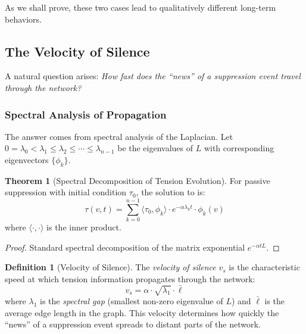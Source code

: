 \documentclass[12pt,a4paper]{article}
\theoremstyle{definition}
\newtheorem{definition}{Definition}[section]
\newtheorem{theorem}{Theorem}[section]
\theoremstyle{remark}
\begin{document}
As we shall prove, these two cases lead to qualitatively different long-term behaviors.

\subsection{The Velocity of Silence}

A natural question arises: \emph{How fast does the ``news'' of a suppression event travel through the network?}

\subsubsection{Spectral Analysis of Propagation}

The answer comes from spectral analysis of the Laplacian. Let $0 = \lambda_0 < \lambda_1 \leq \lambda_2 \leq \cdots \leq \lambda_{n-1}$ be the eigenvalues of $L$ with corresponding eigenvectors $\{\phi_k\}$.

\begin{theorem}[Spectral Decomposition of Tension Evolution]
\label{thm:spectral}
For passive suppression with initial condition $\tau_0$, the solution to  is:
\begin{equation}
    \tau(v, t) = \sum_{k=0}^{n-1} \langle \tau_0, \phi_k \rangle \cdot e^{-\alpha \lambda_k t} \cdot \phi_k(v)
\end{equation}
where $\langle \cdot, \cdot \rangle$ is the inner product.
\end{theorem}

\begin{proof}
Standard spectral decomposition of the matrix exponential $e^{-\alpha t L}$.
\end{proof}

\begin{definition}[Velocity of Silence]
\label{def:velocity-silence}
The \emph{velocity of silence} $v_s$ is the characteristic speed at which tension information propagates through the network:
\begin{equation}
    \boxed{
    v_s = \alpha \cdot \sqrt{\lambda_1} \cdot \bar{\ell}
    }
\end{equation}
where $\lambda_1$ is the \emph{spectral gap} (smallest non-zero eigenvalue of $L$) and $\bar{\ell}$ is the average edge length in the graph. This velocity determines how quickly the ``news'' of a suppression event spreads to distant parts of the network.
\end{definition}
\end{document}
